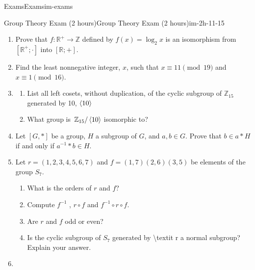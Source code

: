 \documentclass[oneside,10pt,]{book}
\begin{document}
\begin{chapterptx}{Exams}{}{Exams}{}{}{im-exams}
\begin{sectionptx}{Group Theory Exam (2 hours)}{}{Group Theory Exam (2 hours)}{}{}{im-2h-11-15}
\begin{enumerate}
\begin{enumerate}
\item\hypertarget{li-41}{}\hypertarget{p-68}{}%
Find a formula for the inverse of \(f\).%
\item\hypertarget{li-42}{}\hypertarget{p-69}{}%
Find the value of \(k\) such that \(f(k)=2\).%
\end{enumerate}
%
\item\hypertarget{li-43}{}\hypertarget{p-70}{}%
Prove that \(f:\mathbb{R}^+\to  \mathbb{Z}\) defined by \(f(x)=\log_{2}x\) is an isomorphism from \(\left[\mathbb{R}^+;\cdot \right]\) \textbraceleft{} \textbraceright{}into \([\mathbb{R};+]\).%
\item\hypertarget{li-44}{}\hypertarget{p-71}{}%
Find the least nonnegative integer, \(x\), such that \(x\equiv 11\pmod{19}\) and \(x \equiv 1 \pmod{16}\).%
\item\hypertarget{li-45}{}%
\begin{enumerate}
\item\hypertarget{li-46}{}\hypertarget{p-72}{}%
List all left cosets, without duplication, of the cyclic subgroup of \(\mathbb{Z}_{15}\) generated by 10, \(\langle $10$\rangle\)%
\item\hypertarget{li-47}{}\hypertarget{p-73}{}%
What group is \(\left.\mathbb{Z}_{15}\right/\langle 10\rangle\) isomorphic to?%
\end{enumerate}
%
\item\hypertarget{li-48}{}\hypertarget{p-74}{}%
Let \([G,*]\) be a group, \(H\) a subgroup of \(G\), and \(a, b\in G\). Prove that \(b \in  a*H\) if and only if \(a^{-1}*b \in H\).%
\item\hypertarget{li-49}{}\hypertarget{p-75}{}%
Let \(r=(1,2,3,4,5,6,7)\) and \(f=(1,7)(2,6)(3,5)\) be elements of the group \(S_7\).%
\begin{enumerate}
\item\hypertarget{li-50}{}\hypertarget{p-76}{}%
What is the orders of \(r\) and \(f\)?%
\item\hypertarget{li-51}{}\hypertarget{p-77}{}%
Compute \(f^{-1}\) , \(r\circ f\) and \(f^{-1}\circ r\circ f\).%
\item\hypertarget{li-52}{}\hypertarget{p-78}{}%
Are \(r\) and \(f\) odd or even?%
\item\hypertarget{li-53}{}\hypertarget{p-79}{}%
Is the cyclic subgroup of \(S_7\) generated by \textbackslash{}textit\textbraceleft{} r\textbraceright{} a normal subgroup?  Explain your answer.%
\end{enumerate}
%
\item\hypertarget{li-54}{}\hypertarget{p-80}{}%

\end{enumerate}
\end{sectionptx}
\end{chapterptx}
\end{document}
